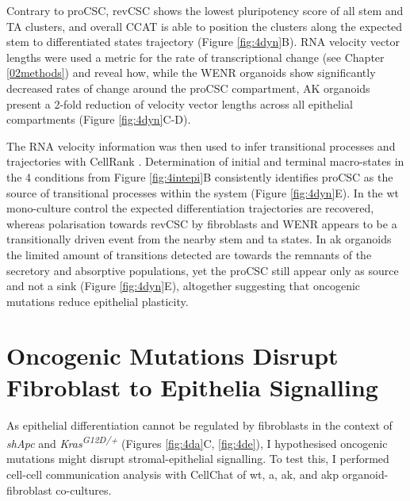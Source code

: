 Contrary to proCSC, revCSC shows the lowest pluripotency score of all stem and TA clusters, and overall CCAT is able to position the clusters along the expected stem to differentiated states trajectory (Figure \ref{fig:4dyn}B). RNA velocity \cite{bergen_generalizing_2020} vector lengths were used a metric for the rate of transcriptional change (see Chapter \ref{02methods}) and reveal how, while the WENR organoids show significantly decreased rates of change around the proCSC compartment, AK organoids present a 2-fold reduction of velocity vector lengths across all epithelial compartments (Figure \ref{fig:4dyn}C-D).

The RNA velocity information was then used to infer transitional processes and trajectories with CellRank \cite{lange_cellrank_2022}. Determination of initial and terminal macro-states in the 4 conditions from Figure \ref{fig:4intepi}B consistently identifies proCSC as the source of transitional processes within the system (Figure \ref{fig:4dyn}E). In the \acrshort{wt} mono-culture control the expected differentiation trajectories are recovered, whereas polarisation towards revCSC by fibroblasts and WENR appears to be a transitionally driven event from the nearby stem and \acrshort{ta} states. In \acrshort{ak} organoids the limited amount of transitions detected are towards the remnants of the secretory and absorptive populations, yet the proCSC still appear only as source and not a sink (Figure \ref{fig:4dyn}E), altogether suggesting that oncogenic mutations reduce epithelial plasticity. 

\newpage
\section{Oncogenic Mutations Disrupt Fibroblast to Epithelia Signalling}

As epithelial differentiation cannot be regulated by fibroblasts in the context of \textit{shApc} and \textit{Kras\textsuperscript{G12D/+}} (Figures \ref{fig:4da}C, \ref{fig:4de}), I hypothesised oncogenic mutations might disrupt stromal-epithelial signalling. To test this, I performed cell-cell communication analysis with CellChat \cite{jin_inference_2021} of \acrshort{wt}, \acrshort{a}, \acrshort{ak}, and \acrshort{akp} organoid-fibroblast co-cultures. 

